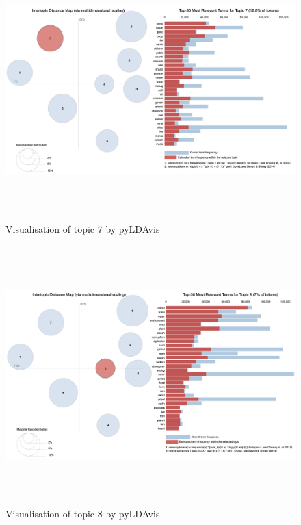 \begin{figure}[H]
    \centering
    \includegraphics[width = 16cm, height = 10cm]{./img/pylda_topic7.png}
    \caption{Visualisation of topic 7 by pyLDAvis}
\end{figure}

\begin{figure}[H]
    \centering
    \includegraphics[width = 16cm, height = 10cm]{./img/pylda_topic8.png}
    \caption{Visualisation of topic 8 by pyLDAvis}
\end{figure}

